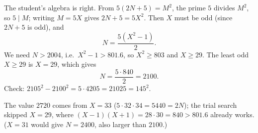 The student's algebra is right. From $5(2N+5)=M^2$, the prime $5$ divides $M^2$, so $5\mid M$; writing $M=5X$ gives $2N+5=5X^2$. Then $X$ must be odd (since $2N+5$ is odd), and
\[
N=\dfrac{5\left(X^2-1\right)}{2}.
\]
We need $N>2004$, i.e.\ $X^2-1>801.6$, so $X^2\ge803$ and $X\ge29$. The least odd $X\ge29$ is $X=29$, which gives
\[
N=\dfrac{5\cdot840}{2}=\boxed{2100}.
\]
Check: $2105^2-2100^2=5\cdot4205=21025=145^2$.

The value $2720$ comes from $X=33$ ($5\cdot32\cdot34=5440=2N$); the trial search skipped $X=29$, where $(X-1)(X+1)=28\cdot30=840>801.6$ already works. ($X=31$ would give $N=2400$, also larger than $2100$.)
